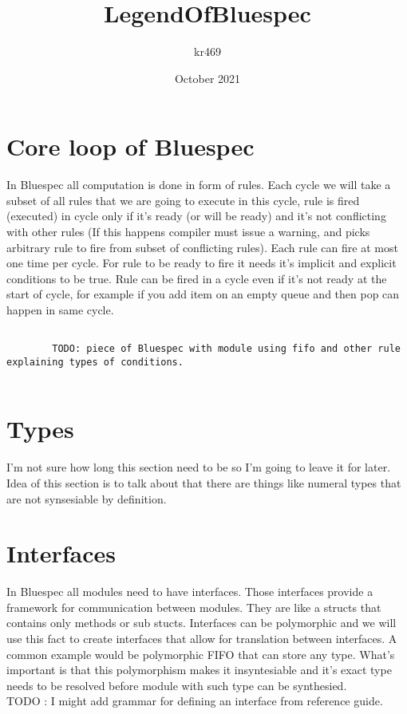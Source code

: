 \documentclass{article}
\title{LegendOfBluespec}
\author{kr469 }
\date{October 2021}
\begin{document}
\maketitle

\section{Core loop of Bluespec}
    In Bluespec all computation is done in form of rules. Each cycle we will take a subset of all rules that we are going to execute in this cycle, rule is fired (executed) in cycle only if it's ready (or will be ready) and it's not conflicting with other rules (If this happens compiler must issue a warning, and picks arbitrary rule to fire from subset of conflicting rules). Each rule can fire at most one time per cycle. For rule to be ready to fire it needs it's implicit and explicit conditions to be true. Rule can be fired in a cycle even if it's not ready at the start of cycle, for example if you add item on an empty queue and then pop can happen in same cycle.
    \begin{verbatim}
        
        TODO: piece of Bluespec with module using fifo and other rule explaining types of conditions.
        
    \end{verbatim}

\section{Types}
    I'm not sure how long this section need to be so I'm going to leave it for later. Idea of this section is to talk about that there are things like numeral types that are not synsesiable by definition. 

\section{Interfaces}
    In Bluespec all modules need to have interfaces. Those interfaces provide a framework for communication between modules. They are like a structs that contains only methods or sub stucts. Interfaces can be polymorphic and we will use this fact to create interfaces that allow for translation between interfaces. A common example would be polymorphic FIFO that can store any type. What's important is that this polymorphism makes it insyntesiable and it's exact type needs to be resolved before module with such type can be synthesied.
    \\
    TODO : I might add grammar for defining an interface from reference guide.  
    
\end{document}
